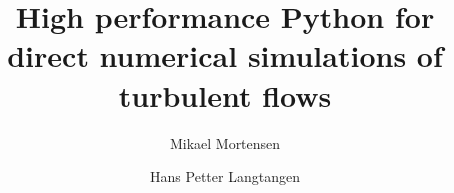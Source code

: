 \documentclass[final,3p,times,twocolumn]{elsarticle}
\begin{document}
\begin{frontmatter}



\title{High performance Python for direct numerical simulations of turbulent flows}


\author[a,b]{Mikael Mortensen}
\author[b,c]{Hans Petter Langtangen}
\address[a]{Department of Mathematics, University of Oslo, Norway}
\address[b]{Center for Biomedical Computing at Simula Research Laboratory, N-1325 Lysaker, Norway}
\address[c]{Department of Informatics, University of Oslo, Norway}


\newcommand{\hpl}[1]{({\bf hpl comment:} \emph{#1})}







\end{frontmatter}
\end{document}
